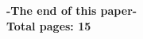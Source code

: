 \renewcommand{\thepage}{}
\printbibliography

\vspace{8cm}

\begin{center}
    \textbf{-The end of this paper- \\ Total pages: 15}
\end{center}
